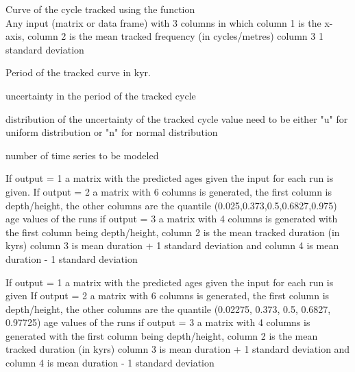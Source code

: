 \documentclass[a4paper]{book}
\begin{document}
%
\begin{Arguments}
\begin{ldescription}
\item[\code{tracked\_cycle\_curve}] Curve of the cycle tracked using the
 function \\{}
Any input (matrix or data frame) with 3 columns in which column 1 is the
x-axis, column 2 is the  mean tracked frequency (in cycles/metres) column 3
1 standard deviation

\item[\code{tracked\_cycle\_period}] Period of the tracked curve in kyr.

\item[\code{tracked\_cycle\_period\_unc}] uncertainty in the period of the tracked cycle

\item[\code{tracked\_cycle\_period\_unc\_dist}] distribution of the uncertainty of the
tracked cycle value need to be either "u" for uniform distribution or
"n" for normal distribution  

\item[\code{n\_simulations}] number of time series to be modeled

\item[\code{output}] If output = 1 a matrix with the predicted ages given the input for each run
is given. If output = 2 a matrix with 6 columns is generated,
the first column is depth/height, the other columns are the quantile
(0.025,0.373,0.5,0.6827,0.975) age values of the runs
if output = 3 a matrix with 4 columns is generated with the first column
being depth/height, column 2 is the mean tracked duration (in kyrs) column 3
is mean duration + 1 standard deviation and column 4  is mean duration -  1
standard deviation
\end{ldescription}
\end{Arguments}
%
\begin{Value}
If output = 1 a matrix with the predicted ages given the input for each run
is given
If output = 2 a matrix with 6 columns is generated, the first column is
depth/height, the other columns are the quantile
(0.02275, 0.373, 0.5, 0.6827, 0.97725) age values of the runs
if output = 3 a matrix with 4 columns is generated with the first column
being depth/height, column 2 is the mean tracked duration (in kyrs) column 3
is mean duration + 1 standard deviation and column 4  is mean duration -  1
standard deviation
\end{Value}
\end{document}
